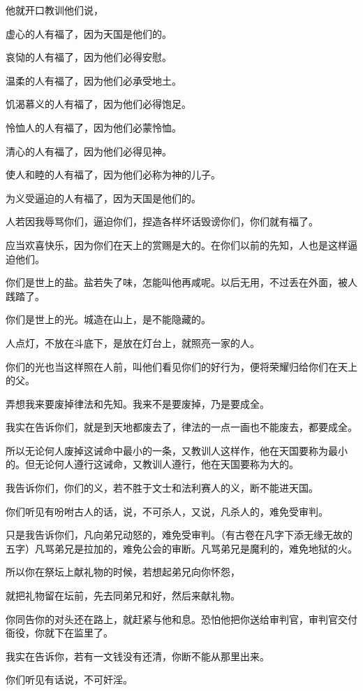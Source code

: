\documentclass[12pt,oneside]{book}
\begin{document}
他就开口教训他们说，

虚心的人有福了，因为天国是他们的。

哀恸的人有福了，因为他们必得安慰。

温柔的人有福了，因为他们必承受地土。

饥渴慕义的人有福了，因为他们必得饱足。

怜恤人的人有福了，因为他们必蒙怜恤。

清心的人有福了，因为他们必得见神。

使人和睦的人有福了，因为他们必称为神的儿子。

为义受逼迫的人有福了，因为天国是他们的。

人若因我辱骂你们，逼迫你们，捏造各样坏话毁谤你们，你们就有福了。

应当欢喜快乐，因为你们在天上的赏赐是大的。在你们以前的先知，人也是这样逼迫他们。

你们是世上的盐。盐若失了味，怎能叫他再咸呢。以后无用，不过丢在外面，被人践踏了。

你们是世上的光。城造在山上，是不能隐藏的。

人点灯，不放在斗底下，是放在灯台上，就照亮一家的人。

你们的光也当这样照在人前，叫他们看见你们的好行为，便将荣耀归给你们在天上的父。

弄想我来要废掉律法和先知。我来不是要废掉，乃是要成全。

我实在告诉你们，就是到天地都废去了，律法的一点一画也不能废去，都要成全。

所以无论何人废掉这诫命中最小的一条，又教训人这样作，他在天国要称为最小的。但无论何人遵行这诫命，又教训人遵行，他在天国要称为大的。

我告诉你们，你们的义，若不胜于文士和法利赛人的义，断不能进天国。

你们听见有吩咐古人的话，说，不可杀人，又说，凡杀人的，难免受审判。

只是我告诉你们，凡向弟兄动怒的，难免受审判。（有古卷在凡字下添无缘无故的五字）凡骂弟兄是拉加的，难免公会的审断。凡骂弟兄是魔利的，难免地狱的火。

所以你在祭坛上献礼物的时候，若想起弟兄向你怀怨，

就把礼物留在坛前，先去同弟兄和好，然后来献礼物。

你同告你的对头还在路上，就赶紧与他和息。恐怕他把你送给审判官，审判官交付衙役，你就下在监里了。

我实在告诉你，若有一文钱没有还清，你断不能从那里出来。

你们听见有话说，不可奸淫。
\end{document}
